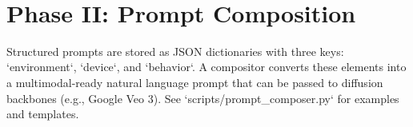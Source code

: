 \
\section{Phase II: Prompt Composition}
Structured prompts are stored as JSON dictionaries with three keys: `environment`, `device`, and `behavior`. A compositor converts these elements into a multimodal-ready natural language prompt that can be passed to diffusion backbones (e.g., Google Veo 3). See `scripts/prompt_composer.py` for examples and templates.
